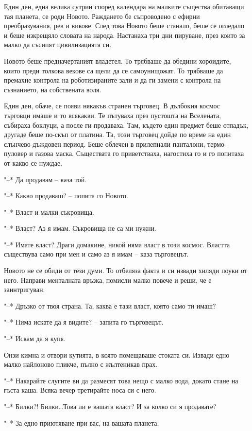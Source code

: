 \documentclass[ebook,openany,12pt]{memoir}
\begin{document}
Един ден, една велика сутрин според календара на малките същества обитаващи тая планета, се роди Новото. Раждането бе съпроводено с ефирни преобразувания, рев и викове. След това Новото беше станало, беше се огледало и беше изкрещяло словата на народа. Настанаха три дни пируване, през които за малко да съсипят цивилизацията си.

Новото беше предначертаният владетел. То трябваше да обедини хороидите, които преди толкова векове са щели да се самоунищожат. То трябваше да премахне контрола на роботизираните зали и да ги замени с контрола на съзнанието, на собствената воля.

Един ден, обаче, се появи някакъв странен търговец. В дълбокия космос търговци имаше и то всякакви. Те пътуваха през пустошта на Вселената, събираха боклуци, а после ги продаваха. Там, където един предмет беше отпадък, другаде беше по-скъп от платина. Та, този търговец дойде по време на един слънчево-дъждовен период. Беше облечен в прилепнали панталони, термо-пуловер и газова маска. Съществата го приветстваха, нагостиха го и го попитаха от какво се нуждае.

"--* Да продавам – каза той.

"--* Какво продаваш? – попита го Новото.

"--* Власт и малки съкровища.

"--* Власт? Аз я имам. Съкровища не са ми нужни.

"--* Имате власт? Драги домакине, никой няма власт в този космос. Властта съществува само при мен и само аз я имам – каза търговецът.

Новото не се обиди от тези думи. То отбеляза факта и си извади хиляди поуки от него. Направи менталната връзка, помисли малко повече и реши, че е заинтригуван.

"--* Дръзко от твоя страна. Та, каква е тази власт, която само ти имаш?

"--* Нима искате да я видите? – запита го търговецът.

"--* Искам да я купя.

Онзи кимна и отвори кутията, в която помещаваше стоката си. Извади едно малко найлоново пликче, пълно с жълтеникав прах.

"--* Накарайте слугите ви да размесят това нещо с малко вода, докато стане на гъста каша. Всяка вечер третирайте носа си с него.

"--* Билки?! Билки\ldots Това ли е вашата власт? И за колко си я продавате?

"--* За едно приютяване при вас, на вашата планета.
\end{document}

